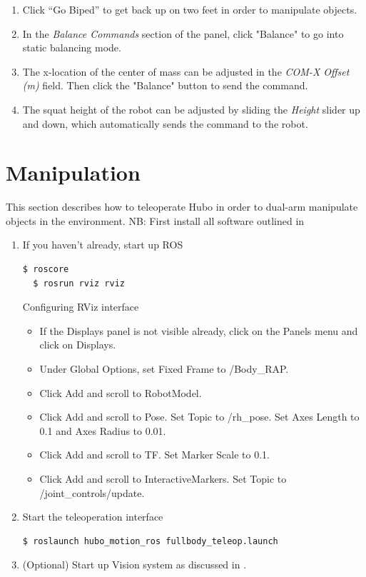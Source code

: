 \documentclass[letterpaper, 10 pt]{report}
\begin{document}
\begin{enumerate}
    \item Click ``Go Biped'' to get back up on two feet in order to manipulate objects.
    \item In the \textit{Balance Commands} section of the panel, click "Balance" to go into static balancing mode.
    \item The x-location of the center of mass can be adjusted in the \textit{COM-X Offset (m)} field. Then click the "Balance" button to send the command.
    \item The squat height of the robot can be adjusted by sliding the \textit{Height} slider up and down, which automatically sends the command to the robot.
  \end{enumerate}
  
\pagebreak
\section{Manipulation}
This section describes how to teleoperate Hubo in order to dual-arm manipulate objects in the environment.
NB: First install all software outlined in 
\begin{enumerate}
  \item If you haven't already, start up ROS
  \begin{lstlisting}[language=bash]
  $ roscore
  $ rosrun rviz rviz
  \end{lstlisting}
  Configuring RViz interface
  \begin{itemize}
    \item If the Displays panel is not visible already, click on the Panels menu and click on Displays.
    \item Under Global Options, set Fixed Frame to /Body\_RAP.
    \item Click Add and scroll to RobotModel.
    \item Click Add and scroll to Pose. Set Topic to /rh\_pose. Set Axes Length to 0.1 and Axes Radius to 0.01.
    \item Click Add and scroll to TF. Set Marker Scale to 0.1.
    \item Click Add and scroll to InteractiveMarkers. Set Topic to /joint\_controls/update.
  \end{itemize}
  \item Start the teleoperation interface
  \begin{lstlisting}[language=bash]
  $ roslaunch hubo_motion_ros fullbody_teleop.launch
  \end{lstlisting}
  \item (Optional) Start up Vision system as discussed in .
\end{enumerate}
\end{document}

